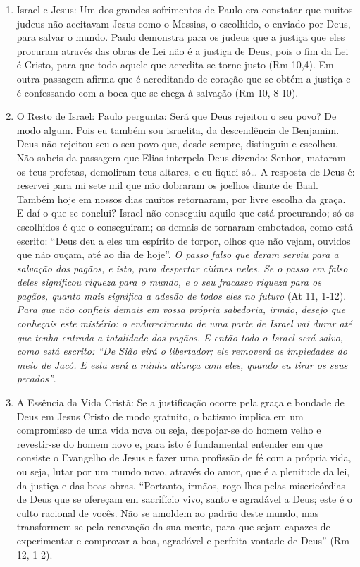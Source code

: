 \documentclass[
]{book}
\begin{document}
\begin{enumerate}
\item
  Israel e Jesus: Um dos grandes sofrimentos de Paulo era constatar que muitos judeus não aceitavam Jesus como o Messias, o escolhido, o enviado por Deus, para salvar o mundo. Paulo demonstra para os judeus que a justiça que eles procuram através das obras de Lei não é a justiça de Deus, pois o fim da Lei é Cristo, para que todo aquele que acredita se torne justo (Rm 10,4). Em outra passagem afirma que é acreditando de coração que se obtém a justiça e é confessando com a boca que se chega à salvação (Rm 10, 8-10).
\item
  O Resto de Israel: Paulo pergunta: Será que Deus rejeitou o seu povo? De modo algum. Pois eu também sou israelita, da descendência de Benjamim. Deus não rejeitou seu o seu povo que, desde sempre, distinguiu e escolheu. Não sabeis da passagem que Elias interpela Deus dizendo: Senhor, mataram os teus profetas, demoliram teus altares, e eu fiquei só\ldots{} A resposta de Deus é: reservei para mi sete mil que não dobraram os joelhos diante de Baal. Também hoje em nossos dias muitos retornaram, por livre escolha da graça. E daí o que se conclui? Israel não conseguiu aquilo que está procurando; só os escolhidos é que o conseguiram; os demais de tornaram embotados, como está escrito: ``Deus deu a eles um espírito de torpor, olhos que não vejam, ouvidos que não ouçam, até ao dia de hoje''. \emph{O passo falso que deram serviu para a salvação dos pagãos, e isto, para despertar ciúmes neles. Se o passo em falso deles significou riqueza para o mundo, e o seu fracasso riqueza para os pagãos, quanto mais significa a adesão de todos eles no futuro} (At 11, 1-12). \emph{Para que não confieis demais em vossa própria sabedoria, irmão, desejo que conheçais este mistério: o endurecimento de uma parte de Israel vai durar até que tenha entrada a totalidade dos pagãos. E então todo o Israel será salvo, como está escrito: ``De Sião virá o libertador; ele removerá as impiedades do meio de Jacó. E esta será a minha aliança com eles, quando eu tirar os seus pecados''}.
\item
  A Essência da Vida Cristã: Se a justificação ocorre pela graça e bondade de Deus em Jesus Cristo de modo gratuito, o batismo implica em um compromisso de uma vida nova ou seja, despojar-se do homem velho e revestir-se do homem novo e, para isto é fundamental entender em que consiste o Evangelho de Jesus e fazer uma profissão de fé com a própria vida, ou seja, lutar por um mundo novo, através do amor, que é a plenitude da lei, da justiça e das boas obras. ``Portanto, irmãos, rogo-lhes pelas misericórdias de Deus que se ofereçam em sacrifício vivo, santo e agradável a Deus; este é o culto racional de vocês. Não se amoldem ao padrão deste mundo, mas transformem-se pela renovação da sua mente, para que sejam capazes de experimentar e comprovar a boa, agradável e perfeita vontade de Deus'' (Rm 12, 1-2).
\end{enumerate}
\end{document}
